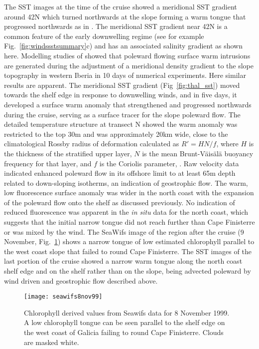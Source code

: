 The SST images at the time of the cruise showed a meridional SST
gradient around 42\deg N which turned northwards at the slope
forming a warm tongue that progressed northwards as in
\citet{Haynes90}. The meridional SST gradient near 42\deg N is a
common feature of the early downwelling regime (see for example
Fig.~\ref{fig:windssstsummary}c) and has an associated salinity
gradient as shown here. Modelling studies of \citet{Dubert98}
showed that poleward flowing surface warm intrusions are generated
during the adjustment of a meridional density gradient to the
slope topography in western Iberia in 10 days of numerical
experiments. Here similar results are apparent. The meridional SST
gradient (Fig~\ref{fig:thal_sst}) moved towards the shelf edge in
response to downwelling winds, and in five days, it developed a
surface warm anomaly that strengthened and progressed northwards
during the cruise, serving as a surface tracer for the slope
poleward flow. The detailed temperature structure at transect N
showed the warm anomaly was restricted to the top 30m and was
approximately 20km wide, close to the climatological Rossby radius
of deformation calculated as $R'=HN/f$, where $H$ is the thickness
of the stratified upper layer, $N$ is the mean Brunt-V\"ais\"al\"a
buoyancy frequency for that layer, and $f$ is the Coriolis
parameter, \citep{Chelton98}. Raw velocity data indicated enhanced
poleward flow in its offshore limit to at least 65m depth related
to down-sloping isotherms, an indication of geostrophic flow. The
warm, low fluorescence surface anomaly was wider in the north
coast with the expansion of the poleward flow onto the shelf as
discussed previously. No indication of reduced fluorescence was
apparent in the {\it in situ} data for the north coast, which
suggests that the initial narrow tongue did not reach further than
Cape Finisterre or was mixed by the wind. The SeaWifs image of the
region after the cruise (9 November, Fig.~\ref{fig:thal_seawifs})
shows a narrow tongue of low estimated chlorophyll parallel to the
west coast slope that failed to round Cape Finisterre. The SST
images of the last portion of the cruise showed a narrow warm
tongue along the north coast shelf edge and on the shelf rather
than on the slope, being advected poleward by wind driven and
geostrophic flow described above.

\begin{figure}[t]
\centering %
\texttt{[image: seawifs8nov99]}
\caption{Chlorophyll derived values from Seawifs data for 8
November 1999. A low chlorophyll tongue can be seen parallel to
the shelf edge on the west coast of Galicia failing to round Cape
Finisterre. Clouds are masked white. } \label{fig:thal_seawifs}
\end{figure}


